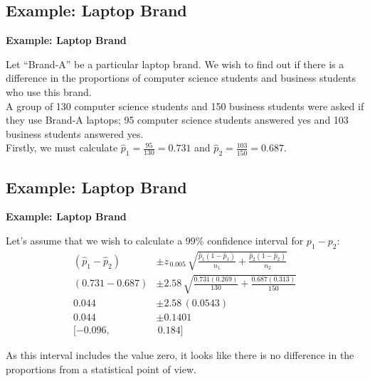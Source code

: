 \documentclass[compress]{beamer}        %
\makeatletter
\newcommand{\tcb}{\textcolor{beamer@blendedblue}}
\makeatother
\begin{document}
\subsection{Example: Laptop Brand}
\begin{frame}{\bf \tcb{Example: Laptop Brand}}

Let ``Brand-A'' be a particular laptop brand. We wish to find out if there is a difference in the proportions of computer science students and business students who use this brand.\\[0.8cm]

A group of 130 computer science students and 150 business students were asked if they use Brand-A laptops; 95 computer science students answered yes and 103 business students answered yes. \\[0.8cm]

Firstly, we must calculate $\hat p_1 = \frac{95}{130} = 0.731$ and $\hat p_2 = \frac{103}{150} = 0.687$.

\end{frame}



\subsection{Example: Laptop Brand}
\begin{frame}{\bf \tcb{Example: Laptop Brand}}

Let's assume that we wish to calculate a 99\% confidence interval for $p_1-p_2$:
\begin{align*}
(\hat p_1 - \hat p_2) &\pm z_{\,0.005}\,\sqrt{\frac{\hat p_1(1-\hat p_1)}{n_1}+\frac{\hat p_2(1-\hat p_2)}{n_2}} \\
(0.731 - 0.687) &\pm 2.58\,\sqrt{\frac{0.731(0.269)}{130}+\frac{0.687(0.313)}{150}}\\
0.044 &\pm 2.58\,(0.0543)\\
0.044  &\pm 0.1401\\[0.2cm]
[-0.096,&\,0.184]
\end{align*}

As this interval includes the value zero, it looks like there is no difference in the proportions from a statistical point of view.

\end{frame}
\end{document}
